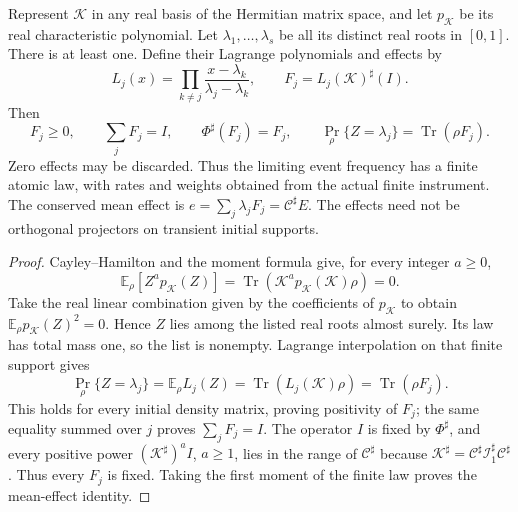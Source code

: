 \documentclass[12pt,a4paper]{article}
\begin{document}
\begin{corollary}
\label{p4:cor:v258-asymptotic-frequency-povm}
Represent $\mathcal K$ in any real basis of the Hermitian matrix space,
and let $p_{\mathcal K}$ be its real characteristic polynomial. Let
$\lambda_1,\ldots,\lambda_s$ be all its distinct real roots in $[0,1]$.
There is at least one. Define their Lagrange polynomials and effects by
\begin{equation}
 L_j(x)=\prod_{k\ne j}\frac{x-\lambda_k}{\lambda_j-\lambda_k},
 \qquad
 F_j=L_j(\mathcal K)^\sharp(I).
 \label{p4:eq:v258-frequency-povm}
\end{equation}
Then
\[
 F_j\ge0,\qquad \sum_jF_j=I,\qquad
 \Phi^\sharp(F_j)=F_j,
 \qquad
 \boxed{\Pr_\rho\{Z=\lambda_j\}=\operatorname{Tr}(\rho F_j).}
\]
Zero effects may be discarded. Thus the limiting event frequency has a
finite atomic law, with rates and weights obtained from the actual
finite instrument. The conserved mean effect is
$e=\sum_j\lambda_jF_j=\mathcal C^\sharp E$. The effects need not be
orthogonal projectors on transient initial supports.
\end{corollary}
\begin{proof}
Cayley--Hamilton and the moment formula give, for every integer $a\ge0$,
\[
 \mathbb E_\rho[Z^ap_{\mathcal K}(Z)]
 =\operatorname{Tr}\!\left(\mathcal K^a
                              p_{\mathcal K}(\mathcal K)\rho\right)=0.
\]
Take the real linear combination given by the coefficients of
$p_{\mathcal K}$ to obtain
$\mathbb E_\rho p_{\mathcal K}(Z)^2=0$. Hence $Z$ lies among the listed
real roots almost surely. Its law has total mass one, so the list is
nonempty. Lagrange interpolation on that finite support gives
\[
 \Pr_\rho\{Z=\lambda_j\}
 =\mathbb E_\rho L_j(Z)
 =\operatorname{Tr}(L_j(\mathcal K)\rho)
 =\operatorname{Tr}(\rho F_j).
\]
This holds for every initial density matrix, proving positivity of
$F_j$; the same equality summed over $j$ proves $\sum_jF_j=I$.
The operator $I$ is fixed by $\Phi^\sharp$, and every positive power
$(\mathcal K^\sharp)^aI$, $a\ge1$, lies in the range of
$\mathcal C^\sharp$ because
$\mathcal K^\sharp=\mathcal C^\sharp\mathcal I_1^\sharp
\mathcal C^\sharp$. Thus every $F_j$ is fixed. Taking the first moment
of the finite law proves the mean-effect identity.
\end{proof}
\end{document}
